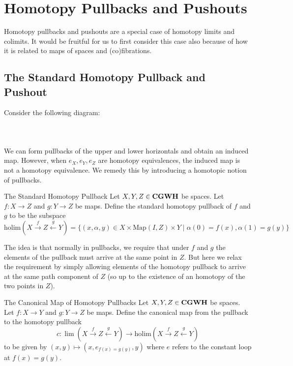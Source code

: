 \documentclass[a4paper]{article}
\begin{document}
\pagebreak
\section{Homotopy Pullbacks and Pushouts}
Homotopy pullbacks and pushouts are a special case of homotopy limits and colimits. It would be fruitful for us to first consider this case also because of how it is related to maps of spaces and (co)fibrations. 

\subsection{The Standard Homotopy Pullback and Pushout}
Consider the following diagram: \\~\\
\\~\\
We can form pullbacks of the upper and lower horizontals and obtain an induced map. However, when $e_X,e_Y,e_Z$ are homotopy equivalences, the induced map is not a homotopy equivalence. We remedy this by introducing a homotopic notion of pullbacks. 

\begin{defn}{The Standard Homotopy Pullback}{} Let $X,Y,Z\in\bold{CGWH}$ be spaces. Let $f:X\to Z$ and $g:Y\to Z$ be maps. Define the standard homotopy pullback of $f$ and $g$ to be the subspace $$\text{holim}(X\overset{f}{\rightarrow}Z\overset{g}{\leftarrow}Y)=\{(x,\alpha,y)\in X\times\text{Map}(I,Z)\times Y\;|\;\alpha(0)=f(x),\alpha(1)=g(y)\}$$
\end{defn}

The idea is that normally in pullbacks, we require that under $f$ and $g$ the elements of the pullback must arrive at the same point in $Z$. But here we relax the requirement by simply allowing elements of the homotopy pullback to arrive at the same path component of $Z$ (so up to the existence of an homotopy of the two points in $Z$). 

\begin{defn}{The Canonical Map of Homotopy Pullbacks}{} Let $X,Y,Z\in\bold{CGWH}$ be spaces. Let $f:X\to Y$ and $g:Y\to Z$ be maps. Define the canonical map from the pullback to the homotopy pullback $$c:\lim(X\overset{f}{\rightarrow}Z\overset{g}{\leftarrow}Y)\to\text{holim}(X\overset{f}{\rightarrow}Z\overset{g}{\leftarrow}Y)$$ to be given by $(x,y)\mapsto(x,e_{f(x)=g(y)},y)$ where $e$ refers to the constant loop at $f(x)=g(y)$. 
\end{defn}
\end{document}
